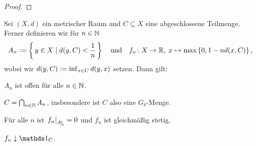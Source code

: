 \documentclass[../main/main.tex]{subfiles}
\begin{document}
	\begin{proof}
	\end{proof}
	
	\begin{Hilfssatz}
		Sei $(X, d)$ ein metrischer Raum und $C \subseteq X$ eine abgeschlossene Teilmenge. Ferner definieren wir für $n \in \mathbb{N}$
		$$ A_n \vcentcolon = \left\{\, y \in X \; | \; d(y, C) < \frac{1}{n} \,\right\} \quad \text{und} \quad f_n \colon X \to \mathbb{R}, \; x \mapsto \max \left\{0, 1-n d(x, C)\right\}  \text{,}$$
		wobei wir $d(y, C) \vcentcolon = \inf_{x \in C} d(y, x)$ setzen.
		Dann gilt:
		\begin{enumeratethm}
			\item $A_n$ ist offen für alle $n \in \mathbb{N}$.
			\item $C = \bigcap_{n \in \mathbb{N}} A_n$, insbesondere ist $C$ also eine $G_\delta$-Menge.
			\item Für alle $n$ ist $\left.f_n\right|_{A_n^\mathsf{c}} = 0$ und $f_n$ ist gleichmäßig stetig.
			\item $f_n \convdown \indfct_C$.
		\end{enumeratethm}
	\end{Hilfssatz}
\end{document}
